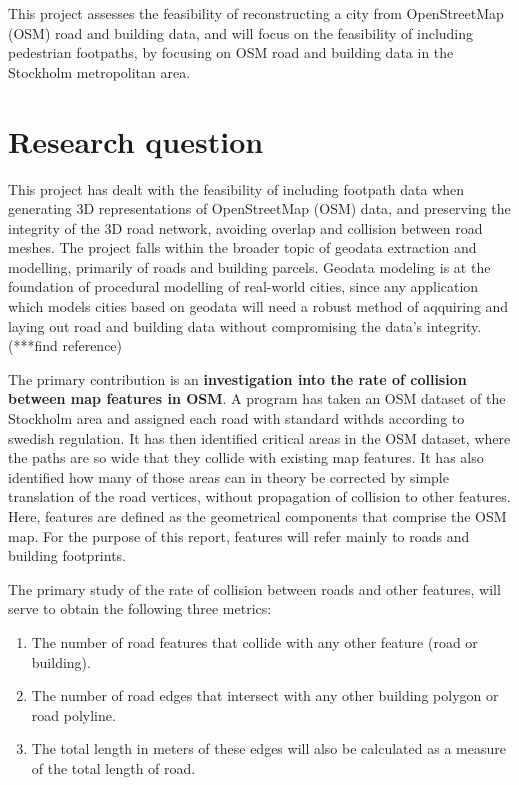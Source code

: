 \documentclass{kththesis}
\begin{document}
This project assesses the feasibility of reconstructing a city from OpenStreetMap (OSM) road and building data, and will focus on the feasibility of including pedestrian footpaths, by focusing on OSM road and building data in the Stockholm metropolitan area.

\section{Research question}

This project has dealt with the feasibility of including footpath data when generating 3D representations of OpenStreetMap (OSM) data, and preserving the integrity of the 3D road network, avoiding overlap and collision between road meshes.
The project falls within the broader topic of geodata extraction and modelling, primarily of roads and building parcels.
Geodata modeling is at the foundation of procedural modelling of real-world cities, since any application which models cities based on geodata will need a robust method of aqquiring and laying out road and building data without compromising the data's integrity. (***find reference)

The primary contribution is an \textbf{investigation into the rate of collision between map features in OSM}.
A program has taken an OSM dataset of the Stockholm area and assigned each road with standard withds according to swedish regulation.
It has then identified critical areas in the OSM dataset, where the paths are so wide that they collide with existing map features.
It has also identified how many of those areas can in theory be corrected by simple translation of the road vertices, without propagation of collision to other features.
Here, features are defined as the geometrical components that comprise the OSM map.
For the purpose of this report, features will refer mainly to roads and building footprints.

The primary study of the rate of collision between roads and other features, will serve to obtain the following three metrics:

\begin{enumerate}
    \item The number of road features that collide with any other feature (road or building).
    \item The number of road edges that intersect with any other building polygon or road polyline.
    \item The total length in meters of these edges will also be calculated as a measure of the total length of road.
\end{enumerate}
\end{document}
